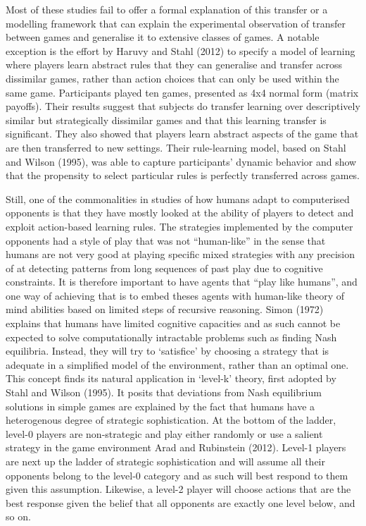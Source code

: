 \documentclass[man,floatsintext]{apa6}
\begin{document}
Most of these studies fail to offer a formal explanation of this transfer or a modelling framework that can explain the experimental observation of transfer between games and generalise it to extensive classes of games. A notable exception is the effort by Haruvy and Stahl (2012) to specify a model of learning where players learn abstract rules that they can generalise and transfer across dissimilar games, rather than action choices that can only be used within the same game. Participants played ten games, presented as 4x4 normal form (matrix payoffs). Their results suggest that subjects do transfer learning over descriptively similar but strategically dissimilar games and that this learning transfer is significant. They also showed that players learn abstract aspects of the game that are then transferred to new settings. Their rule-learning model, based on Stahl and Wilson (1995), was able to capture participants' dynamic behavior and show that the propensity to select particular rules is perfectly transferred across games.

Still, one of the commonalities in studies of how humans adapt to computerised opponents is that they have mostly looked at the ability of players to detect and exploit action-based learning rules. The strategies implemented by the computer opponents had a style of play that was not ``human-like'' in the sense that humans are not very good at playing specific mixed strategies with any precision of at detecting patterns from long sequences of past play due to cognitive constraints. It is therefore important to have agents that ``play like humans'', and one way of achieving that is to embed theses agents with human-like theory of mind abilities based on limited steps of recursive reasoning. Simon (1972) explains that humans have limited cognitive capacities and as such cannot be expected to solve computationally intractable problems such as finding Nash equilibria. Instead, they will try to `satisfice' by choosing a strategy that is adequate in a simplified model of the environment, rather than an optimal one. This concept finds its natural application in `level-k' theory, first adopted by Stahl and Wilson (1995). It posits that deviations from Nash equilibrium solutions in simple games are explained by the fact that humans have a heterogenous degree of strategic sophistication. At the bottom of the ladder, level-0 players are non-strategic and play either randomly or use a salient strategy in the game environment Arad and Rubinstein (2012). Level-1 players are next up the ladder of strategic sophistication and will assume all their opponents belong to the level-0 category and as such will best respond to them given this assumption. Likewise, a level-2 player will choose actions that are the best response given the belief that all opponents are exactly one level below, and so on.
\end{document}
